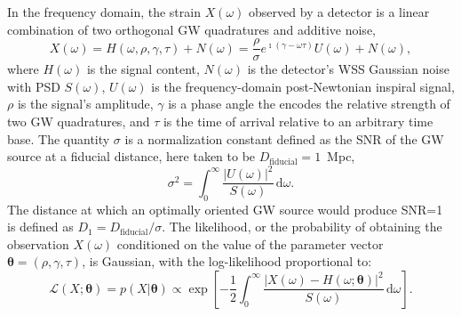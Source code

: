 \documentclass{iopart}
\begin{document}
In the frequency domain, the strain $X (\omega)$ observed by a detector is a linear combination of two orthogonal \ac{GW} quadratures and additive noise,
%
\begin{equation}\label{eq:signal-model}
	X (\omega) = H (\omega, \rho, \gamma, \tau) + N (\omega) = \frac{\rho}{\sigma} e^{\imath (\gamma - \omega \tau)} U (\omega) + N (\omega),
\end{equation}
%
where $H (\omega)$ is the signal content, $N (\omega)$ is the detector's \ac{WSS} Gaussian noise with \ac{PSD} $S(\omega)$, $U (\omega)$ is the frequency-domain post-Newtonian inspiral signal, $\rho$ is the signal's amplitude, $\gamma$ is a phase angle the encodes the relative strength of two \ac{GW} quadratures, and $\tau$ is the time of arrival relative to an arbitrary time base. The quantity $\sigma$ is a normalization constant defined as the \ac{SNR} of the \ac{GW} source at a fiducial distance, here taken to be $D_\mathrm{fiducial} = 1$~Mpc,
%
\begin{equation}\label{eq:sigma}
    \sigma^2 = \int_0^\infty \frac{\left| U (\omega)\right|^2}{S(\omega)} \, \mathrm{d}\omega.
\end{equation}
%
The distance at which an optimally oriented \ac{GW} source would produce \ac{SNR}=1 is defined as $D_1 = D_\mathrm{fiducial} / \sigma$. The likelihood, or the probability of obtaining the observation $X(\omega)$ conditioned on the value of the parameter vector $\boldsymbol\theta = (\rho, \gamma, \tau)$, is Gaussian, with the log-likelihood proportional to:
%
\begin{equation}\label{eq:gaussian-likelihood}
	\mathcal{L}(X; \boldsymbol\theta) = p(X | \boldsymbol\theta)
		\propto \exp \left[
		- \frac{1}{2} \int_0^\infty \frac{\left|X (\omega)
			- H(\omega; \boldsymbol\theta) \right|^2}{S(\omega)} \, \mathrm{d}\omega
	\right].
\end{equation}
\end{document}
